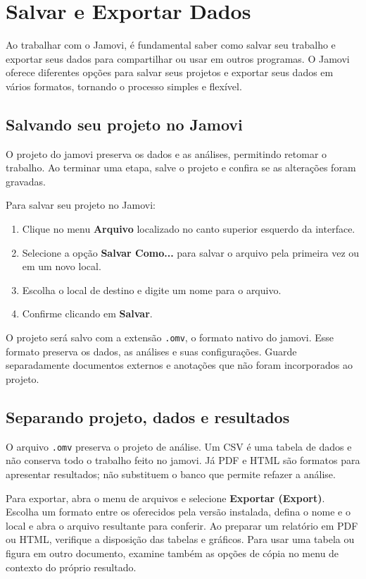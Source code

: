 \section{Salvar e Exportar Dados}

Ao trabalhar com o Jamovi, é fundamental saber como salvar seu trabalho e exportar seus dados para compartilhar ou usar em outros programas. O Jamovi oferece diferentes opções para salvar seus projetos e exportar seus dados em vários formatos, tornando o processo simples e flexível.

\subsection{Salvando seu projeto no Jamovi}

O projeto do jamovi preserva os dados e as análises, permitindo retomar o trabalho. Ao terminar uma etapa, salve o projeto e confira se as alterações foram gravadas.

Para salvar seu projeto no Jamovi:

\begin{enumerate}
    \item Clique no menu \textbf{Arquivo} localizado no canto superior esquerdo da interface.
    \item Selecione a opção \textbf{Salvar Como...} para salvar o arquivo pela primeira vez ou em um novo local.
    \item Escolha o local de destino e digite um nome para o arquivo.
    \item Confirme clicando em \textbf{Salvar}.
\end{enumerate}

O projeto será salvo com a extensão \texttt{.omv}, o formato nativo do jamovi. Esse formato preserva os dados, as análises e suas configurações. Guarde separadamente documentos externos e anotações que não foram incorporados ao projeto.

\subsection{Separando projeto, dados e resultados}

O arquivo \texttt{.omv} preserva o projeto de análise. Um CSV é uma tabela de dados e não conserva todo o trabalho feito no jamovi. Já PDF e HTML são formatos para apresentar resultados; não substituem o banco que permite refazer a análise.

Para exportar, abra o menu de arquivos e selecione \textbf{Exportar (Export)}. Escolha um formato entre os oferecidos pela versão instalada, defina o nome e o local e abra o arquivo resultante para conferir. Ao preparar um relatório em PDF ou HTML, verifique a disposição das tabelas e gráficos. Para usar uma tabela ou figura em outro documento, examine também as opções de cópia no menu de contexto do próprio resultado.

